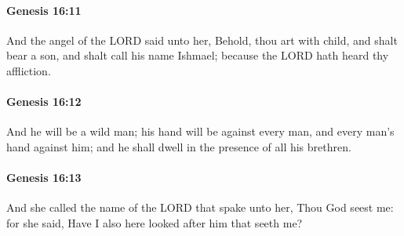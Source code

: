 		\paragraph{Genesis 16:11} %
			\label{GENESIS-16-11}

			And the angel of the LORD said unto her, Behold, thou art with child, and shalt bear a son, and shalt call his name Ishmael; because the LORD hath heard thy affliction.


		\paragraph{Genesis 16:12} %
			\label{GENESIS-16-12}

			And he will be a wild man; his hand will be against every man, and every man's hand against him; and he shall dwell in the presence of all his brethren.


		\paragraph{Genesis 16:13} %
			\label{GENESIS-16-13}

			And she called the name of the LORD that spake unto her, Thou God seest me: for she said, Have I also here looked after him that seeth me?


